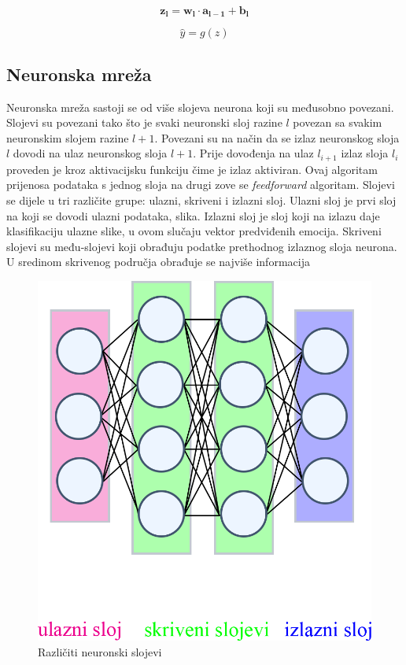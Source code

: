 \documentclass[times, utf8, zavrsni,numeric,pstricks]{fer}
\newcommand{\vect}[1]{\boldsymbol{#1}}
\begin{document}
\begin{equation}\label{eq:neuron_layer}
	\boldsymbol{\vect{z_l}} = \vect{w_l} \cdot \vect{a_{l-1}} + \vect{b_l}
\end{equation}

\begin{equation}\label{eq:neuron_layer_activation}
	\hat{y} = g(z)
\end{equation}

\subsection{Neuronska mreža}



Neuronska mreža sastoji se od više slojeva neurona koji su međusobno povezani. Slojevi su povezani tako što je svaki neuronski sloj razine $l$ povezan sa svakim neuronskim slojem razine $l+1$. Povezani su na način da se izlaz neuronskog sloja $l$ dovodi na ulaz neuronskog sloja $l+1$. Prije dovođenja na ulaz $l_{i+1}$ izlaz sloja $l_i$ proveden je kroz aktivacijsku funkciju čime je izlaz aktiviran. Ovaj algoritam prijenosa podataka s jednog sloja na drugi zove se \textit{feedforward} algoritam. Slojevi se dijele u tri različite grupe: ulazni, skriveni i izlazni sloj. Ulazni sloj je prvi sloj na koji se dovodi ulazni podataka, slika. Izlazni sloj je sloj koji na izlazu daje klasifikaciju ulazne slike, u ovom slučaju vektor predviđenih emocija. Skriveni slojevi su među-slojevi koji obrađuju podatke prethodnog izlaznog sloja neurona. U sredinom skrivenog područja obrađuje se najviše informacija 

\begin{figure}[H]
	\centering
	\includegraphics[width=\linewidth, height=0.3\paperheight, keepaspectratio]{neuron_layers.png}
	\caption{Različiti neuronski slojevi}
	\label{pic:ck_example}
\end{figure}
\end{document}

